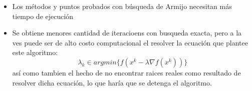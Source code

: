 \begin{itemize}
    \item Los métodos y puntos probados con búsqueda de Armijo necesitan más tiempo de ejecución    
    \item Se obtiene menores cantidad de iteracioens con busqueda exacta, pero a la ves puede ser de alto costo computacional el resolver la ecuación que plantee este algoritmo:
\[\lambda_k \in  argmin\{ f(x^k-\lambda \nabla f(x^k) ) \}\]
así como tambien el hecho de no encontrar raices reales como resultado de resolver dicha ecuación, lo que haría que se detenga el algoritmo.

\end{itemize}